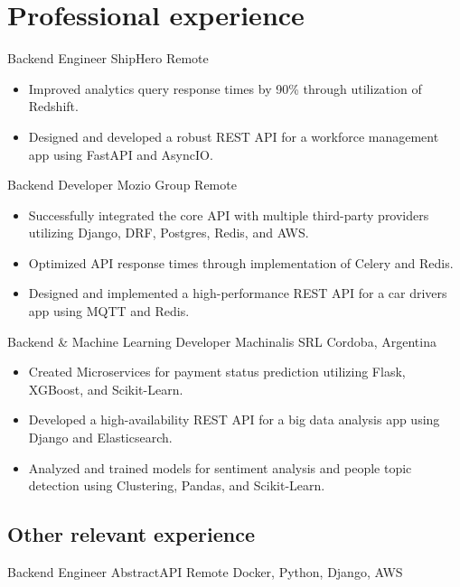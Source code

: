 
\section{Professional experience}
    {Backend Engineer} %
    {ShipHero} %
    {Remote} %
    {}
    {
      \begin{itemize} %
        \item {Improved analytics query response times by 90\% through utilization of Redshift.}
        \item {Designed and developed a robust REST API for a workforce management app using FastAPI and AsyncIO.}
      \end{itemize}
    }
    {Backend Developer} %
    {Mozio Group} %
    {Remote} %
    {}
    {
      \begin{itemize} %
        \item {Successfully integrated the core API with multiple third-party providers utilizing Django, DRF, Postgres, Redis, and AWS.}
        \item {Optimized API response times through implementation of Celery and Redis.}
        \item {Designed and implemented a high-performance REST API for a car drivers app using MQTT and Redis.}
      \end{itemize}
    }
    {Backend \& Machine Learning Developer} %
    {Machinalis SRL} %
    {Cordoba, Argentina} %
    {}
    {
      \begin{itemize} %
        \item {Created Microservices for payment status prediction utilizing Flask, XGBoost, and Scikit-Learn.}
        \item {Developed a high-availability REST API for a big data analysis app using Django and Elasticsearch.}
        \item {Analyzed and trained models for sentiment analysis and people topic detection using Clustering, Pandas, and Scikit-Learn.}
      \end{itemize}
    }

\subsection{Other relevant experience}
    {Backend Engineer} %
    {AbstractAPI} %
    {Remote} %
    {}
    {Docker, Python, Django, AWS}

